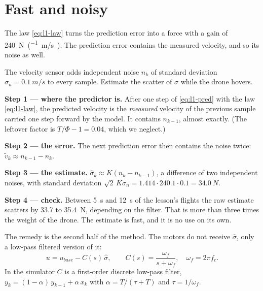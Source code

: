 \section{Fast and noisy}

The law \cref{eq:l1-law} turns the prediction error into a force with a gain of \SI{240}{N\per(m/s)}. The prediction error contains the measured velocity, and so its noise as well.

\begin{example}
\label{ex:l1-raw}
The velocity sensor adds independent noise $n_k$ of standard deviation $\sigma_n = \SI{0.1}{m/s}$ to every sample. Estimate the scatter of $\hat\sigma$ while the drone hovers.

\textbf{Step 1 — where the predictor is.} After one step of \cref{eq:l1-pred} with the law \cref{eq:l1-law}, the predicted velocity is the \emph{measured} velocity of the previous sample carried one step forward by the model. It contains $n_{k-1}$, almost exactly. (The leftover factor is $T/\Phi - 1 = 0.04$, which we neglect.)

\textbf{Step 2 — the error.} The next prediction error then contains the noise twice: $\tilde v_k \approx n_{k-1} - n_k$.

\textbf{Step 3 — the estimate.} $\hat\sigma_k \approx K(n_k - n_{k-1})$, a difference of two independent noises, with standard deviation $\sqrt2\,K\sigma_n = 1.414 \cdot 240.1 \cdot 0.1 = \SI{34.0}{N}$.

\textbf{Step 4 — check.} Between \SI{5}{s} and \SI{12}{s} of the lesson's flights the raw estimate scatters by 33.7 to \SI{35.4}{N}, depending on the filter. That is more than three times the weight of the drone. The estimate is fast, and it is no use on its own.
\end{example}

The remedy is the second half of the method. The motors do not receive $\hat\sigma$, only a low-pass filtered version of it:
\begin{equation}\label{eq:l1-u}
  u = u_{base} - C(s)\,\hat\sigma, \qquad C(s) = \frac{\omega_f}{s + \omega_f}, \quad \omega_f = 2\pi f_c .
\end{equation}
In the simulator $C$ is a first-order discrete low-pass filter, $y_k = (1 - \alpha)\,y_{k-1} + \alpha\,x_k$ with $\alpha = T/(\tau + T)$ and $\tau = 1/\omega_f$.

